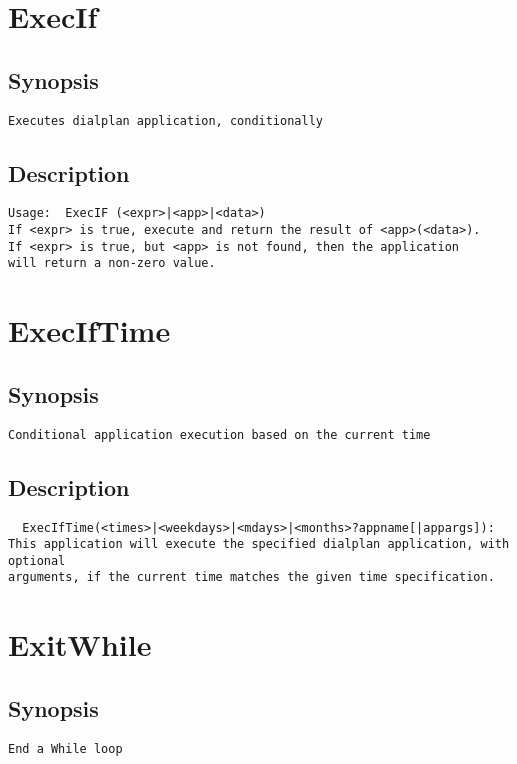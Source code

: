 \section{ExecIf}
\subsection{Synopsis}
\begin{verbatim}
Executes dialplan application, conditionally
\end{verbatim}
\subsection{Description}
\begin{verbatim}
Usage:  ExecIF (<expr>|<app>|<data>)
If <expr> is true, execute and return the result of <app>(<data>).
If <expr> is true, but <app> is not found, then the application
will return a non-zero value.

\end{verbatim}


\section{ExecIfTime}
\subsection{Synopsis}
\begin{verbatim}
Conditional application execution based on the current time
\end{verbatim}
\subsection{Description}
\begin{verbatim}
  ExecIfTime(<times>|<weekdays>|<mdays>|<months>?appname[|appargs]):
This application will execute the specified dialplan application, with optional
arguments, if the current time matches the given time specification.

\end{verbatim}


\section{ExitWhile}
\subsection{Synopsis}
\begin{verbatim}
End a While loop
\end{verbatim}
